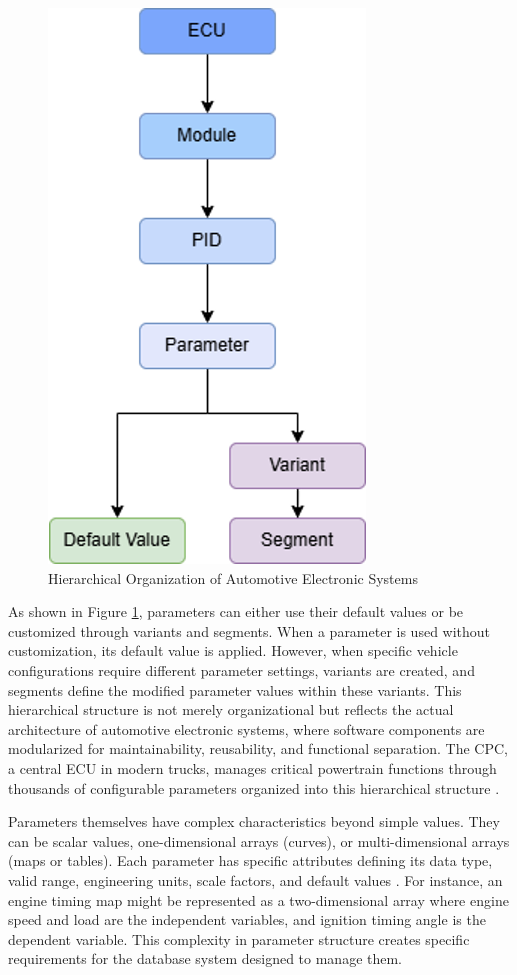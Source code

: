 \begin{figure}[ht]
    \centering
    \includegraphics[height=0.4\textheight]{figures/ecu_hierarchy.png}
    \caption{Hierarchical Organization of Automotive Electronic Systems}
    \label{fig:ecu-hierarchy}
\end{figure}

As shown in Figure \ref{fig:ecu-hierarchy}, parameters can either use their default values or be customized through variants and segments. When a parameter is used without customization, its default value is applied. However, when specific vehicle configurations require different parameter settings, variants are created, and segments define the modified parameter values within these variants. This hierarchical structure is not merely organizational but reflects the actual architecture of automotive electronic systems, where software components are modularized for maintainability, reusability, and functional separation. The \ac{CPC}, a central \ac{ECU} in modern trucks, manages critical powertrain functions through thousands of configurable parameters organized into this hierarchical structure \cite{staron2021automotive}.

Parameters themselves have complex characteristics beyond simple values. They can be scalar values, one-dimensional arrays (curves), or multi-dimensional arrays (maps or tables). Each parameter has specific attributes defining its data type, valid range, engineering units, scale factors, and default values \cite{pretschner2007software}. For instance, an engine timing map might be represented as a two-dimensional array where engine speed and load are the independent variables, and ignition timing angle is the dependent variable. This complexity in parameter structure creates specific requirements for the database system designed to manage them.


